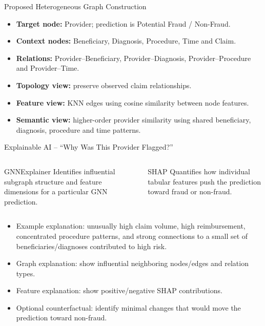 \documentclass[aspectratio=169,11pt]{beamer}
\begin{document}
\begin{frame}{Proposed Heterogeneous Graph Construction}
\begin{itemize}
\item \textbf{Target node:} Provider; prediction is Potential Fraud / Non-Fraud.
\item \textbf{Context nodes:} Beneficiary, Diagnosis, Procedure, Time and Claim.
\item \textbf{Relations:} Provider--Beneficiary, Provider--Diagnosis, Provider--Procedure and Provider--Time.
\item \textbf{Topology view:} preserve observed claim relationships.
\item \textbf{Feature view:} KNN edges using cosine similarity between node features.
\item \textbf{Semantic view:} higher-order provider similarity using shared beneficiary, diagnosis, procedure and time patterns.
\end{itemize}\end{frame}

\begin{frame}{Explainable AI -- ``Why Was This Provider Flagged?''}
\begin{columns}[T]
\begin{block}{GNNExplainer}
Identifies influential subgraph structure and feature dimensions for a particular GNN prediction.
\end{block}
\begin{block}{SHAP}
Quantifies how individual tabular features push the prediction toward fraud or non-fraud.
\end{block}
\end{columns}
\begin{itemize}
\item Example explanation: unusually high claim volume, high reimbursement, concentrated procedure patterns, and strong connections to a small set of beneficiaries/diagnoses contributed to high risk.
\item Graph explanation: show influential neighboring nodes/edges and relation types.
\item Feature explanation: show positive/negative SHAP contributions.
\item Optional counterfactual: identify minimal changes that would move the prediction toward non-fraud.
\end{itemize}\end{frame}
\end{document}
